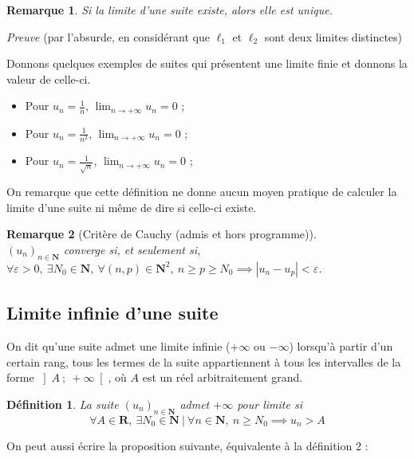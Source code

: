 \documentclass[12pt,a4paper]{article}
\newcommand{\R}{\mathbf{R}}
\newcommand{\N}{\mathbf{N}}
\newcommand{\vabs}[1]{\left\lvert #1 \right\rvert}
\newcommand{\ioo}[2]{\left]#1~;~#2\right[}
\theoremstyle{break}
\newtheorem{definition}{Définition}
\theoremstyle{plain}
\theoremstyle{nonumberplain}
\newtheorem{remarque}{Remarque}
\theoremstyle{nonumberbreak}
\begin{document}
\begin{remarque}
  Si la limite d'une suite existe, alors elle est unique.
\end{remarque}

\begin{minipage}{0.99\linewidth}
  \emph{Preuve} (par l'absurde, en considérant que $\ell_1$ et $\ell_2$ sont
  deux limites distinctes)
  \vspace{3cm}
\end{minipage}

Donnons quelques exemples de suites qui présentent une limite finie et
donnons la valeur de celle-ci.

\begin{itemize}
  \item Pour $u_n = \frac1n$, $\lim_{n\to +\infty}u_n = 0$ ;
  \item Pour $u_n = \frac1{n^2}$, $\lim_{n\to +\infty}u_n = 0$ ;
  \item Pour $u_n = \frac1{\sqrt{n}}$, $\lim_{n\to +\infty}u_n = 0$ ;
\end{itemize}

On remarque que cette définition ne donne aucun moyen pratique de
calculer la limite d'une suite ni même de dire si celle-ci existe.

\begin{remarque}[Critère de Cauchy (admis et hors programme)]~\\
  $(u_n)_{n\in\N}$ converge si, et seulement si, $\forall \varepsilon >
  0,\ \exists N_0\in\N,\ \forall (n,p)\in\N^2,\ n\geq p\geq N_0 \implies
  \vabs{u_n - u_p} < \varepsilon$.
\end{remarque}

\subsection{Limite infinie d'une suite}

On dit qu'une suite admet une limite infinie ($+\infty$ ou $-\infty$)
lorsqu'à partir d'un certain rang, tous les termes de la suite
appartiennent à tous les intervalles de la forme $\ioo{A}{+\infty}$, où
$A$ est un réel arbitraitement grand.

\begin{definition}
  La suite $(u_n)_{n\in\N}$ admet $+\infty$ pour limite si \[ \forall
    A\in\R,\ \exists N_0\in\N\ |\ \forall n\in\N,\ n\geq N_0 \implies
  u_n > A \]
\end{definition}

On peut aussi écrire la proposition suivante, équivalente à la
définition 2 :
\end{document}
